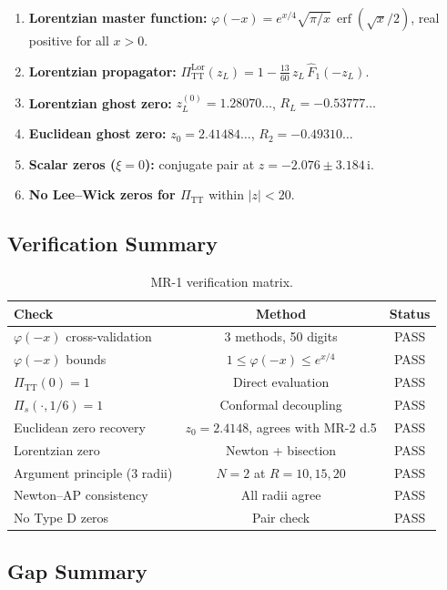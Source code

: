 \documentclass[11pt,a4paper]{article}
\theoremstyle{definition}
\theoremstyle{remark}
\newcommand{\ii}{\mathrm{i}}
\newcommand{\erf}{\operatorname{erf}}
\begin{document}
\begin{enumerate}
  \item \textbf{Lorentzian master function:}
    $\varphi(-x) = e^{x/4}\sqrt{\pi/x}\,\erf(\sqrt{x}/2)$, real
    positive for all $x > 0$.
  \item \textbf{Lorentzian propagator:}
    $\Pi_{\mathrm{TT}}^{\mathrm{Lor}}(z_L) = 1 - \frac{13}{60}\,z_L\,
    \hat{F}_1(-z_L)$.
  \item \textbf{Lorentzian ghost zero:}
    $z_L^{(0)} = 1.28070\ldots$, $R_L = -0.53777\ldots$
  \item \textbf{Euclidean ghost zero:}
    $z_0 = 2.41484\ldots$, $R_2 = -0.49310\ldots$
  \item \textbf{Scalar zeros ($\xi = 0$):} conjugate pair at
    $z = -2.076 \pm 3.184\,\ii$.
  \item \textbf{No Lee--Wick zeros for $\Pi_{\mathrm{TT}}$} within
    $|z| < 20$.
\end{enumerate}

\subsection{Verification Summary}

\begin{table}[H]
\centering
\caption{MR-1 verification matrix.}
\label{tab:verification}
\begin{tabular}{lcc}
\toprule
Check & Method & Status \\
\midrule
$\varphi(-x)$ cross-validation & 3 methods, 50 digits & PASS \\
$\varphi(-x)$ bounds & $1 \leq \varphi(-x) \leq e^{x/4}$ & PASS \\
$\Pi_{\mathrm{TT}}(0) = 1$ & Direct evaluation & PASS \\
$\Pi_s(\cdot, 1/6) = 1$ & Conformal decoupling & PASS \\
Euclidean zero recovery & $z_0 = 2.4148$, agrees with MR-2 d.5 & PASS \\
Lorentzian zero & Newton + bisection & PASS \\
Argument principle (3 radii) & $N = 2$ at $R = 10, 15, 20$ & PASS \\
Newton--AP consistency & All radii agree & PASS \\
No Type D zeros & Pair check & PASS \\
\bottomrule
\end{tabular}
\end{table}

\subsection{Gap Summary}
\end{document}
